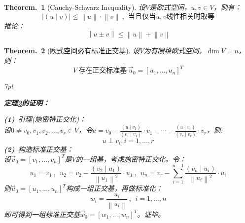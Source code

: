 \documentclass[zihao=5,UTF8]{report}
\theoremstyle{mystyle} %
\newtheorem{theorem}{Theorem.\,}
\newenvironment{graybox}{%
\def\FrameCommand{%
\hspace{1pt}%
{\color{gray}\small \vrule width 2pt}%
{\color{graybox_color}\vrule width 4pt}%
\colorbox{graybox_color}%
}%
\MakeFramed{\advance\hsize-\width\FrameRestore}%
\noindent\hspace{-4.55pt}%
\begin{adjustwidth}{}{7pt}%
\vspace{2pt}\vspace{2pt}%
}
{%
\vspace{2pt}\end{adjustwidth}\endMakeFramed%
}
\begin{document}
\begin{theorem}[Cauchy-Schwarz Inequality]
    设$V$是欧式空间，$u,v \in V$，则有：
    \begin{equation*}
        |(u\mid v) | \le \left \| u \right \|\cdot\left \| v \right \| \ ,\ \ \text{当且仅当$u,v$线性相关时取等}
    \end{equation*}
推论：
\begin{equation*}
    \left \| u \pm v \right \| \le \left \| u \right \| + \left \| v \right \|
\end{equation*}
\end{theorem}
\begin{theorem}[欧式空间必有标准正交基]\label{有限维欧式空间必有标准正交基}
    设$V$为有限维欧式空间，$\dim V = n$，则：
    \begin{equation*}
        V\ \text{存在正交标准基}\ \vec{u}_0 = [u_1,...,u_n]^T
    \end{equation*}
\begin{graybox}
\textbf{定理\ref{有限维欧式空间必有标准正交基}的证明：}\par \noindent
\textbf{(1)}\ 引理(施密特正交化)：\\
设$0 \ne v_0,v_1,v_2,...,v_r \in V$，令$u = v_0 - \frac{(u\mid v_1)}{(v_1 \mid v_1)}\cdot v_1 - \cdots -  \frac{(u\mid v_{r})}{(v_{r} \mid v_{r})}\cdot v_{r}$，则:
\begin{equation*}
    u \perp v_i , i =1,...,r   
\end{equation*}
\textbf{(2)}\ 构造标准正交基：\\
设$\vec{v}_0 = [v_1,...,v_n]^T$是$V$的一组基，考虑施密特正交化。令：
\begin{equation*}
    u_1 = v_1\ ,\ \ u_2 = v_2 - \frac{(v_2\mid u_1)}{\left \| u_1 \right \|^2}\cdot u_1\ ,\ \ u_n = v_r -\sum_{i=1}^{n-1} \frac{(v_n\mid u_i)}{\left \| u_i \right \|^2}\cdot u_i
\end{equation*}
则$\vec{u}_0 = [u_1,...,u_n]^T$构成一组正交基，再做标准化：
\begin{equation*}
    w_i = \frac{u_i}{\left \| u_i \right \|}\ ,\ \ i = 1,...,n
\end{equation*}
即可得到一组标准正交基$\vec{w}_0 = [w_1,...,w_n]^T$。证毕。
\end{graybox}
\end{theorem}
\end{document}
